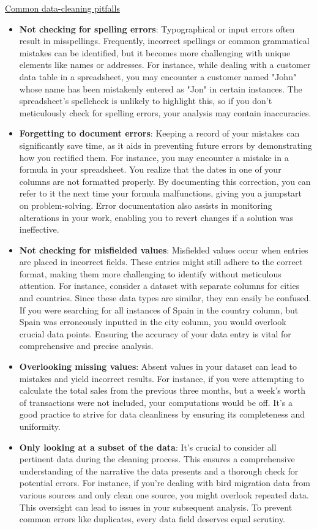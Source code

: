 \documentclass[]{article}
\begin{document}
\uline{Common data-cleaning pitfalls}

\begin{itemize}
  \item \textbf{Not checking for spelling errors}: Typographical or input errors often result in misspellings. Frequently, incorrect spellings or common grammatical mistakes can be identified, but it becomes more challenging with unique elements like names or addresses. For instance, while dealing with a customer data table in a spreadsheet, you may encounter a customer named "John" whose name has been mistakenly entered as "Jon" in certain instances. The spreadsheet's spellcheck is unlikely to highlight this, so if you don't meticulously check for spelling errors, your analysis may contain inaccuracies.
  \item \textbf{Forgetting to document errors}: Keeping a record of your mistakes can significantly save time, as it aids in preventing future errors by demonstrating how you rectified them. For instance, you may encounter a mistake in a formula in your spreadsheet. You realize that the dates in one of your columns are not formatted properly. By documenting this correction, you can refer to it the next time your formula malfunctions, giving you a jumpstart on problem-solving. Error documentation also assists in monitoring alterations in your work, enabling you to revert changes if a solution was ineffective.
  \item \textbf{Not checking for misfielded values}: Misfielded values occur when entries are placed in incorrect fields. These entries might still adhere to the correct format, making them more challenging to identify without meticulous attention. For instance, consider a dataset with separate columns for cities and countries. Since these data types are similar, they can easily be confused. If you were searching for all instances of Spain in the country column, but Spain was erroneously inputted in the city column, you would overlook crucial data points. Ensuring the accuracy of your data entry is vital for comprehensive and precise analysis.
  \item \textbf{Overlooking missing values}: Absent values in your dataset can lead to mistakes and yield incorrect results. For instance, if you were attempting to calculate the total sales from the previous three months, but a week’s worth of transactions were not included, your computations would be off. It’s a good practice to strive for data cleanliness by ensuring its completeness and uniformity.
  \item \textbf{Only looking at a subset of the data}: It’s crucial to consider all pertinent data during the cleaning process. This ensures a comprehensive understanding of the narrative the data presents and a thorough check for potential errors. For instance, if you’re dealing with bird migration data from various sources and only clean one source, you might overlook repeated data. This oversight can lead to issues in your subsequent analysis. To prevent common errors like duplicates, every data field deserves equal scrutiny.

\end{itemize}
\end{document}
